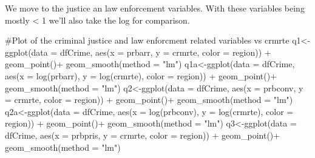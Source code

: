\documentclass[]{article}
\newenvironment{Shaded}{}{}
\newcommand{\CommentTok}[1]{\textcolor[rgb]{0.00,0.50,0.00}{#1}}
\newcommand{\DataTypeTok}[1]{#1}
\newcommand{\KeywordTok}[1]{\textcolor[rgb]{0.00,0.00,1.00}{#1}}
\newcommand{\NormalTok}[1]{#1}
\newcommand{\OperatorTok}[1]{#1}
\newcommand{\StringTok}[1]{\textcolor[rgb]{0.00,0.50,0.50}{#1}}
\begin{document}
We move to the justice an law enforcement variables. With these
variables being mostly \textless{} 1 we'll also take the log for
comparison.

\begin{Shaded}
\begin{Highlighting}[]
\CommentTok{#Plot of the criminal justice and law enforcment related variables vs crmrte}
\NormalTok{q1<-}\KeywordTok{ggplot}\NormalTok{(}\DataTypeTok{data =}\NormalTok{ dfCrime, }\KeywordTok{aes}\NormalTok{(}\DataTypeTok{x =}\NormalTok{ prbarr, }\DataTypeTok{y =}\NormalTok{ crmrte, }\DataTypeTok{color =}\NormalTok{ region)) }\OperatorTok{+}\StringTok{ }
\StringTok{      }\KeywordTok{geom_point}\NormalTok{()}\OperatorTok{+}
\StringTok{  }\KeywordTok{geom_smooth}\NormalTok{(}\DataTypeTok{method =} \StringTok{"lm"}\NormalTok{)}
\NormalTok{q1a<-}\KeywordTok{ggplot}\NormalTok{(}\DataTypeTok{data =}\NormalTok{ dfCrime, }\KeywordTok{aes}\NormalTok{(}\DataTypeTok{x =} \KeywordTok{log}\NormalTok{(prbarr), }\DataTypeTok{y =} \KeywordTok{log}\NormalTok{(crmrte), }\DataTypeTok{color =}\NormalTok{ region)) }\OperatorTok{+}\StringTok{ }
\StringTok{      }\KeywordTok{geom_point}\NormalTok{()}\OperatorTok{+}
\StringTok{  }\KeywordTok{geom_smooth}\NormalTok{(}\DataTypeTok{method =} \StringTok{"lm"}\NormalTok{)}
\NormalTok{q2<-}\KeywordTok{ggplot}\NormalTok{(}\DataTypeTok{data =}\NormalTok{ dfCrime, }\KeywordTok{aes}\NormalTok{(}\DataTypeTok{x =}\NormalTok{ prbconv, }\DataTypeTok{y =}\NormalTok{ crmrte, }\DataTypeTok{color =}\NormalTok{ region)) }\OperatorTok{+}\StringTok{ }
\StringTok{      }\KeywordTok{geom_point}\NormalTok{()}\OperatorTok{+}
\StringTok{  }\KeywordTok{geom_smooth}\NormalTok{(}\DataTypeTok{method =} \StringTok{"lm"}\NormalTok{)}
\NormalTok{q2a<-}\KeywordTok{ggplot}\NormalTok{(}\DataTypeTok{data =}\NormalTok{ dfCrime, }\KeywordTok{aes}\NormalTok{(}\DataTypeTok{x =} \KeywordTok{log}\NormalTok{(prbconv), }\DataTypeTok{y =} \KeywordTok{log}\NormalTok{(crmrte), }\DataTypeTok{color =}\NormalTok{ region)) }\OperatorTok{+}\StringTok{ }
\StringTok{      }\KeywordTok{geom_point}\NormalTok{()}\OperatorTok{+}
\StringTok{  }\KeywordTok{geom_smooth}\NormalTok{(}\DataTypeTok{method =} \StringTok{"lm"}\NormalTok{)}
\NormalTok{q3<-}\KeywordTok{ggplot}\NormalTok{(}\DataTypeTok{data =}\NormalTok{ dfCrime, }\KeywordTok{aes}\NormalTok{(}\DataTypeTok{x =}\NormalTok{ prbpris, }\DataTypeTok{y =}\NormalTok{ crmrte, }\DataTypeTok{color =}\NormalTok{ region)) }\OperatorTok{+}\StringTok{ }
\StringTok{      }\KeywordTok{geom_point}\NormalTok{()}\OperatorTok{+}
\StringTok{  }\KeywordTok{geom_smooth}\NormalTok{(}\DataTypeTok{method =} \StringTok{"lm"}\NormalTok{)}

\end{Highlighting}
\end{Shaded}
\end{document}
